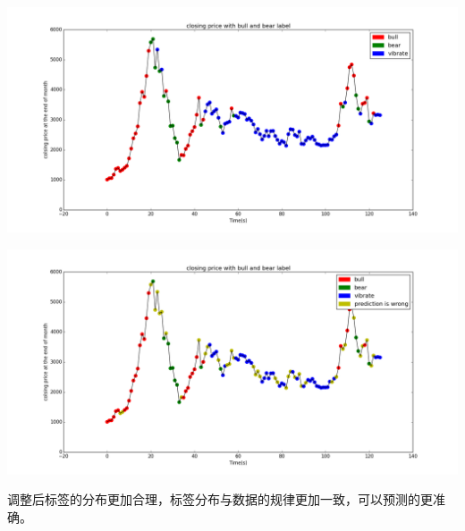 \documentclass[10pt,a4paper]{article}
\begin{document}
\begin{center}
	\includegraphics[width=1\textwidth]{预测结果_调整.png}

\end{center}\begin{center}
\includegraphics[width=1\textwidth]{预测错误的结果_调整.png}

\end{center}

调整后标签的分布更加合理，标签分布与数据的规律更加一致，可以预测的更准确。
%	
	
\end{document}
